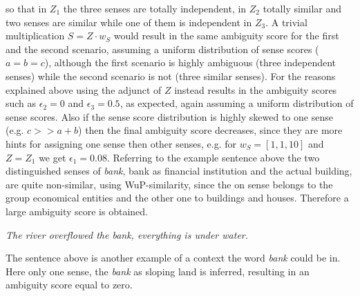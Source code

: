 \documentclass{custom_report}
\begin{document}
so that in $Z_1$ the three senses are totally independent, in $Z_2$ totally similar and two senses are similar while one of them is independent in $Z_3$. A trivial multiplication $S = Z \cdot w_S$ would result in the same ambiguity score for the first and the second scenario, assuming a uniform distribution of sense scores ($a = b = c$), although the first scenario is highly ambiguous (three independent senses) while the second scenario is not (three similar senses). For the reasons explained above using the adjunct of $Z$ instead results in the ambiguity scores such as $\epsilon_2 = 0$ and $\epsilon_3 = 0.5$, as expected, again assuming a uniform distribution of sense scores. Also if the sense score distribution is highly skewed to one sense (e.g. $c >> a + b$) then the final ambiguity score decreases, since they are more hints for assigning one sense then other senses, e.g. for $w_S = [1, 1, 10]$ and $Z = Z_1$ we get $\epsilon_1 = 0.08$. 
\newline
Referring to the example sentence above the two distinguished senses of \textit{bank}, bank as financial institution and the actual building, are quite non-similar, using WuP-similarity, since the on sense belongs to the group economical entities and the other one to buildings and houses. Therefore a large ambiguity score is obtained. 

\vspace*{0.5cm}
\begin{center}
\textit{The river overflowed the bank, everything is under water.}
\end{center}
\vspace*{0.5cm}

The sentence above is another example of a context the word \textit{bank} could be in. Here only one sense, the \textit{bank} as sloping land is inferred, resulting in an ambiguity score equal to zero. 
\end{document}
